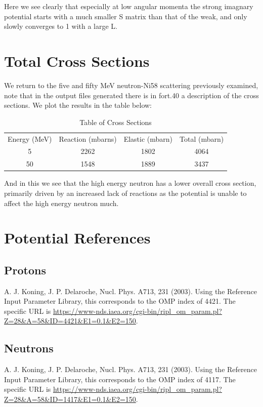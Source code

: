 \documentclass[paper=a4, fontsize=11pt]{scrartcl} %
\numberwithin{equation}{section} %
\numberwithin{figure}{section} %
\numberwithin{table}{section} %
\begin{document}
Here we see clearly that especially at low angular momenta the strong imagnary potential starts with a much smaller S matrix than that of the weak, and only slowly converges to 1 with a large L. \\

\section{Total Cross Sections}

We return to the five and fifty MeV neutron-Ni58 scattering previously examined, note that in the output files generated there is in fort.40 a description of the cross sections. We plot the results in the table below:\\

\begin{table}[hbt!]
\centering
\begin{tabular}{|c|c|c|c|}
Energy (MeV) & Reaction  (mbarns) & Elastic (mbarn)& Total (mbarn)\\
5 & 2262 & 1802 & 4064 \\
50 & 1548 &1889 & 3437 
\end{tabular}
\caption{Table of Cross Sections}
\end{table}

And in this we see that the high energy neutron has a lower overall cross section, primarily driven by an increased lack of reactions as the potential is unable to affect the high energy neutron much.
\section{ Potential References}

\subsection{Protons} A. J. Koning, J. P. Delaroche, Nucl. Phys. A713, 231 (2003). Using the Reference Input Parameter Library, this corresponds to the OMP index of 4421. The specific URL is \url{https://www-nds.iaea.org/cgi-bin/ripl_om_param.pl?Z=28&A=58&ID=4421&E1=0.1&E2=150}.
\subsection{Neutrons}A. J. Koning, J. P. Delaroche, Nucl. Phys. A713, 231 (2003). Using the Reference Input Parameter Library, this corresponds to the OMP index of 4117. The specific URL is \url{https://www-nds.iaea.org/cgi-bin/ripl_om_param.pl?Z=28&A=58&ID=1417&E1=0.1&E2=150}.
\end{document}
